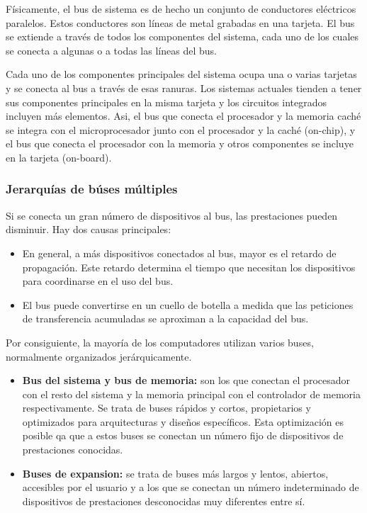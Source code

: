 Físicamente, el bus de sistema es de hecho un conjunto de conductores eléctricos paralelos. Estos conductores son líneas de metal grabadas en una tarjeta. El bus se extiende a través de todos los componentes del sistema, cada uno de los cuales se conecta a algunas o a todas las líneas del bus.

Cada uno de los componentes principales del sistema ocupa una o varias tarjetas y se conecta al bus a través de esas ranuras. Los sistemas actuales tienden a tener sus componentes principales en la misma tarjeta y los circuitos integrados incluyen más elementos. Asi, el bus que conecta el procesador y la memoria caché se integra con el microprocesador junto con el procesador y la caché (on-chip), y el bus que conecta el procesador con la memoria y otros componentes se incluye en la tarjeta (on-board).

\subsubsection{Jerarquías de búses múltiples}

Si se conecta un gran número de dispositivos al bus, las prestaciones pueden disminuir. Hay dos causas principales:

\begin{itemize}
  \item En general, a más dispositivos conectados al bus, mayor es el retardo de propagación. Este retardo determina el tiempo que necesitan los dispositivos para coordinarse en el uso del bus.
  \item El bus puede convertirse en un cuello de botella a medida que las peticiones de transferencia acumuladas se aproximan a la capacidad del bus.
\end{itemize}

Por consiguiente, la mayoría de los computadores utilizan varios buses, normalmente organizados jerárquicamente. 

\begin{itemize}
  \item \textbf{Bus del sistema y bus de memoria:} son los que conectan el procesador con el resto del sistema y la memoria principal con el controlador de memoria respectivamente. Se trata de buses rápidos y cortos, propietarios y optimizados para arquitecturas y diseños específicos. Esta optimización es posible qa que a estos buses se conectan un número fijo de dispositivos de prestaciones conocidas.
  \item \textbf{Buses de expansion:} se trata de buses más largos y lentos, abiertos, accesibles por el usuario y a los que se conectan un número indeterminado de dispositivos de prestaciones desconocidas muy diferentes entre sí.
\end{itemize}

